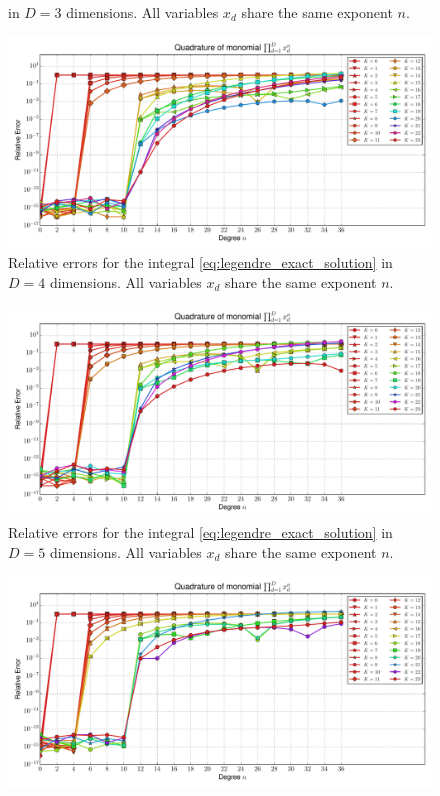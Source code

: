 \documentclass[a4paper,10pt]{article}
\begin{document}
\begin{subfigures}
\begin{figure}
{    in $D=3$ dimensions. All variables $x_d$ share the same exponent $n$.}
    \label{fig:monomial_errors_legendre_multivariate_dimension_3}
  \end{figure}
  \begin{figure}\centering
    \includegraphics[width=\linewidth]{./img/monomial_errors_legendre_multivariate_dimension_4.pdf}
    \caption{Relative errors for the integral \eqref{eq:legendre_exact_solution}
    in $D=4$ dimensions. All variables $x_d$ share the same exponent $n$.}
    \label{fig:monomial_errors_legendre_multivariate_dimension_4}
  \end{figure}
  \begin{figure}\centering
    \includegraphics[width=\linewidth]{./img/monomial_errors_legendre_multivariate_dimension_5.pdf}
    \caption{Relative errors for the integral \eqref{eq:legendre_exact_solution}
    in $D=5$ dimensions. All variables $x_d$ share the same exponent $n$.}
    \label{fig:monomial_errors_legendre_multivariate_dimension_5}
  \end{figure}
  \begin{figure}\centering
    \includegraphics[width=\linewidth]{./img/monomial_errors_legendre_multivariate_dimension_6.pdf}

\end{figure}
\end{subfigures}
\end{document}
